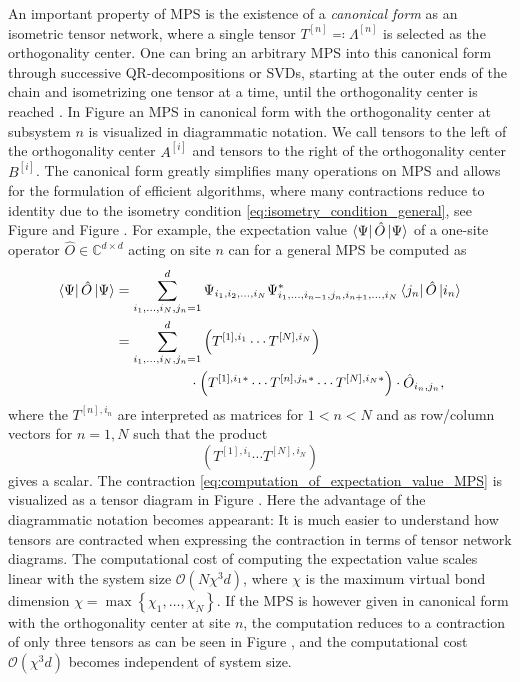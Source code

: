 An important property of MPS is the existence of a \textit{canonical form} as an isometric tensor network, where a single tensor $T^{[n]} \eqqcolon \Lambda^{[n]}$ is selected as the orthogonality center. One can bring an arbitrary MPS into this canonical form through successive QR-decompositions or SVDs, starting at the outer ends of the chain and isometrizing one tensor at a time, until the orthogonality center is reached \cite{cite:DMRG_in_the_age_of_MPS}. In Figure  an MPS in canonical form with the orthogonality center at subsystem $n$ is visualized in diagrammatic notation. We call tensors to the left of the orthogonality center $A^{[i]}$ and tensors to the right of the orthogonality center $B^{[i]}$. The canonical form greatly simplifies many operations on MPS and allows for the formulation of efficient algorithms, where many contractions reduce to identity due to the isometry condition \eqref{eq:isometry_condition_general}, see Figure  and Figure . For example, the expectation value $\bra{\Psi}\hat{O}\ket{\Psi}$ of a one-site operator $\hat{O} \in \mathbb{C}^{d\times d}$ acting on site $n$ can for a general MPS be computed as
\begin{equation}
\begin{split}
	\label{eq:computation_of_expectation_value_MPS}
	\bra{\Psi}\hat{O}\ket{\Psi} &=\sum_{i_1,\dots,i_N,j_n=1}^{d}\Psi_{i_1,i_2,\dots,i_N} \Psi_{i_1,\dots,i_{n-1},j_n,i_{n+1},\dots,i_N}^* \bra{j_n}\hat{O} \ket{i_n} \\
	&= \sum_{i_1,\dots,i_N,j_n=1}^{d} \left(T^{[1],i_1}\cdots T^{[N],i_N}\right) \\
	&\quad\quad\quad\quad\quad\,\,\cdot\left(T^{[1],i_1*}\cdots T^{[n],j_n*} \cdots T^{[N],i_N*}\right)\cdot \hat{O}_{i_n,j_n},
\end{split}
\end{equation}
where the $T^{[n],i_n}$ are interpreted as matrices for $1 < n < N$ and as row/column vectors for $n = 1, N$ such that the product
\begin{equation}
	\left(T^{[1],i_1}\cdots T^{[N],i_N}\right)
\end{equation}
gives a scalar. The contraction \eqref{eq:computation_of_expectation_value_MPS} is visualized as a tensor diagram in Figure . Here the advantage of the diagrammatic notation becomes appearant: It is much easier to understand how tensors are contracted when expressing the contraction in terms of tensor network diagrams. The computational cost of computing the expectation value scales linear with the system size $\mathcal{O}\left(N\chi^3d\right)$, where $\chi$ is the maximum virtual bond dimension $\chi = \max\left\{\chi_1,\dots,\chi_N\right\}$. If the MPS is however given in canonical form with the orthogonality center at site $n$, the computation reduces to a contraction of only three tensors as can be seen in Figure , and the computational cost $\mathcal{O}\left(\chi^3d\right)$ becomes independent of system size. \par
